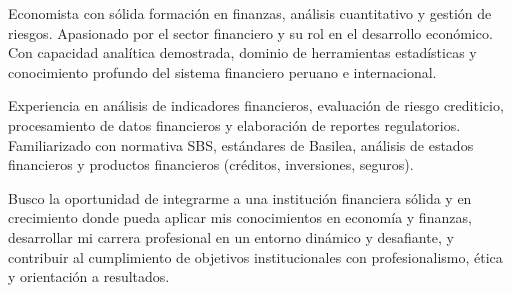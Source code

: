\par{

	Economista con sólida formación en finanzas, análisis cuantitativo y gestión de riesgos. Apasionado por el sector financiero y su rol en el desarrollo económico. Con capacidad analítica demostrada, dominio de herramientas estadísticas y conocimiento profundo del sistema financiero peruano e internacional.

	Experiencia en análisis de indicadores financieros, evaluación de riesgo crediticio, procesamiento de datos financieros y elaboración de reportes regulatorios. Familiarizado con normativa SBS, estándares de Basilea, análisis de estados financieros y productos financieros (créditos, inversiones, seguros).

	Busco la oportunidad de integrarme a una institución financiera sólida y en crecimiento donde pueda aplicar mis conocimientos en economía y finanzas, desarrollar mi carrera profesional en un entorno dinámico y desafiante, y contribuir al cumplimiento de objetivos institucionales con profesionalismo, ética y orientación a resultados.





}
